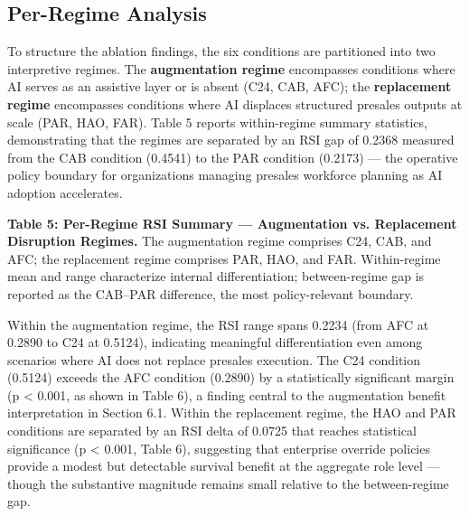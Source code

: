 \documentclass[10pt, conference]{IEEEtran}
\begin{document}
\subsection{Per-Regime Analysis}

\label{sec:per_regime_analysis}

To structure the ablation findings, the six conditions are partitioned into two interpretive regimes. The \textbf{augmentation regime} encompasses conditions where AI serves as an assistive layer or is absent (C24, CAB, AFC); the \textbf{replacement regime} encompasses conditions where AI displaces structured presales outputs at scale (PAR, HAO, FAR). Table 5 reports within-regime summary statistics, demonstrating that the regimes are separated by an RSI gap of 0.2368 measured from the CAB condition (0.4541) to the PAR condition (0.2173) --- the operative policy boundary for organizations managing presales workforce planning as AI adoption accelerates.

\textbf{Table 5: Per-Regime RSI Summary --- Augmentation vs. Replacement Disruption Regimes.} The augmentation regime comprises C24, CAB, and AFC; the replacement regime comprises PAR, HAO, and FAR. Within-regime mean and range characterize internal differentiation; between-regime gap is reported as the CAB--PAR difference, the most policy-relevant boundary.

\begin{table}[ht]
\centering
\caption{Comparison of Regime across Conditions, Mean RSI, RSI Range, Mean Seed Std}
\label{tab:5}
\end{table}

Within the augmentation regime, the RSI range spans 0.2234 (from AFC at 0.2890 to C24 at 0.5124), indicating meaningful differentiation even among scenarios where AI does not replace presales execution. The C24 condition (0.5124) exceeds the AFC condition (0.2890) by a statistically significant margin (p < 0.001, as shown in Table 6), a finding central to the augmentation benefit interpretation in Section 6.1. Within the replacement regime, the HAO and PAR conditions are separated by an RSI delta of 0.0725 that reaches statistical significance (p < 0.001, Table 6), suggesting that enterprise override policies provide a modest but detectable survival benefit at the aggregate role level --- though the substantive magnitude remains small relative to the between-regime gap.
\end{document}
